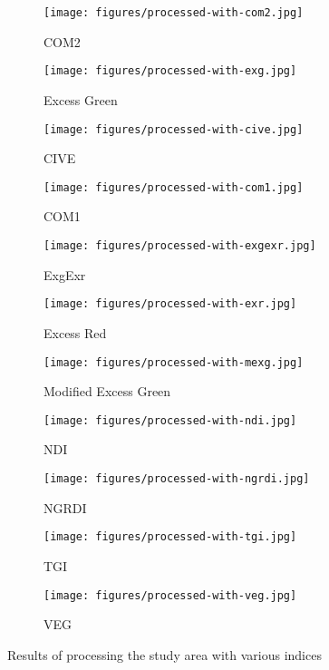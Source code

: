 \documentclass[letterpaper]{article}
\begin{document}
{{\begin{figure}[H]
\centering
\begin{subfigure}{.32\textwidth}
	\centering
	\texttt{[image: figures/processed-with-com2.jpg]}
	\caption{COM2}
\end{subfigure}
\begin{subfigure}{.32\textwidth}
	\centering
	\texttt{[image: figures/processed-with-exg.jpg]}
	\caption{Excess Green}
\end{subfigure}
\begin{subfigure}{.32\textwidth}
	\centering
	\texttt{[image: figures/processed-with-cive.jpg]}
	\caption{CIVE}
\end{subfigure}
\begin{subfigure}{.32\textwidth}
	\centering
	\texttt{[image: figures/processed-with-com1.jpg]}
	\caption{COM1}
\end{subfigure}
\begin{subfigure}{.32\textwidth}
	\centering
	\texttt{[image: figures/processed-with-exgexr.jpg]}
	\caption{ExgExr}
\end{subfigure}
\begin{subfigure}{.32\textwidth}
	\centering
	\texttt{[image: figures/processed-with-exr.jpg]}
	\caption{Excess Red}
\end{subfigure}
\begin{subfigure}{.32\textwidth}
	\centering
	\texttt{[image: figures/processed-with-mexg.jpg]}
	\caption{Modified Excess Green}
\end{subfigure}
\begin{subfigure}{.32\textwidth}
	\centering
	\texttt{[image: figures/processed-with-ndi.jpg]}
	\caption{NDI}
\end{subfigure}
\begin{subfigure}{.32\textwidth}
	\centering
	\texttt{[image: figures/processed-with-ngrdi.jpg]}
	\caption{NGRDI}
\end{subfigure}
\begin{subfigure}{.32\textwidth}
	\centering
	\texttt{[image: figures/processed-with-tgi.jpg]}
	\caption{TGI}
\end{subfigure}
\begin{subfigure}{.32\textwidth}
	\centering
	\texttt{[image: figures/processed-with-veg.jpg]}
	\caption{VEG}
\end{subfigure}
\caption{Results of processing the study area with various indices}
\end{figure}

}}
\end{document}
